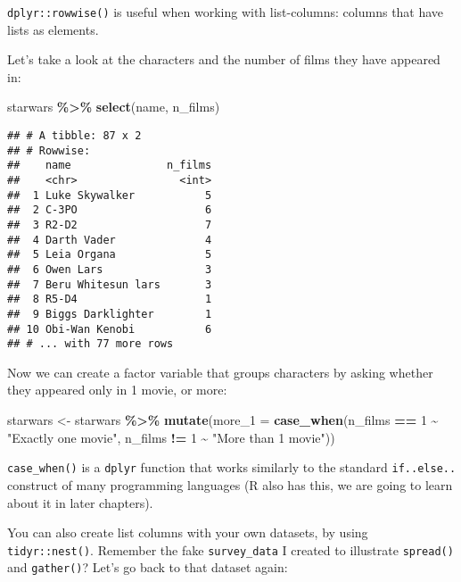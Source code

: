 \documentclass[
]{article}
\newenvironment{Shaded}{\begin{snugshade}}{\end{snugshade}}
\newcommand{\DataTypeTok}[1]{\textcolor[rgb]{0.13,0.29,0.53}{#1}}
\newcommand{\DecValTok}[1]{\textcolor[rgb]{0.00,0.00,0.81}{#1}}
\newcommand{\KeywordTok}[1]{\textcolor[rgb]{0.13,0.29,0.53}{\textbf{#1}}}
\newcommand{\NormalTok}[1]{#1}
\newcommand{\OperatorTok}[1]{\textcolor[rgb]{0.81,0.36,0.00}{\textbf{#1}}}
\newcommand{\StringTok}[1]{\textcolor[rgb]{0.31,0.60,0.02}{#1}}
\begin{document}
\texttt{dplyr::rowwise()} is useful when working with list-columns: columns that have lists as elements.

Let's take a look at the characters and the number of films they have appeared in:

\begin{Shaded}
\begin{Highlighting}[]
\NormalTok{starwars }\OperatorTok{\%\textgreater{}\%}
\StringTok{  }\KeywordTok{select}\NormalTok{(name, n\_films)}
\end{Highlighting}
\end{Shaded}

\begin{verbatim}
## # A tibble: 87 x 2
## # Rowwise: 
##    name               n_films
##    <chr>                <int>
##  1 Luke Skywalker           5
##  2 C-3PO                    6
##  3 R2-D2                    7
##  4 Darth Vader              4
##  5 Leia Organa              5
##  6 Owen Lars                3
##  7 Beru Whitesun lars       3
##  8 R5-D4                    1
##  9 Biggs Darklighter        1
## 10 Obi-Wan Kenobi           6
## # ... with 77 more rows
\end{verbatim}

Now we can create a factor variable that groups characters by asking whether they appeared only in
1 movie, or more:

\begin{Shaded}
\begin{Highlighting}[]
\NormalTok{starwars \textless{}{-}}\StringTok{ }\NormalTok{starwars }\OperatorTok{\%\textgreater{}\%}
\StringTok{  }\KeywordTok{mutate}\NormalTok{(}\DataTypeTok{more\_1 =} \KeywordTok{case\_when}\NormalTok{(n\_films }\OperatorTok{==}\StringTok{ }\DecValTok{1} \OperatorTok{\textasciitilde{}}\StringTok{ "Exactly one movie"}\NormalTok{,}
\NormalTok{                            n\_films }\OperatorTok{!=}\StringTok{ }\DecValTok{1} \OperatorTok{\textasciitilde{}}\StringTok{ "More than 1 movie"}\NormalTok{))}
\end{Highlighting}
\end{Shaded}

\texttt{case\_when()} is a \texttt{dplyr} function that works similarly to the standard \texttt{if..else..} construct of
many programming languages (R also has this, we are going to learn about it in later chapters).

You can also create list columns with your own datasets, by using \texttt{tidyr::nest()}. Remember the
fake \texttt{survey\_data} I created to illustrate \texttt{spread()} and \texttt{gather()}? Let's go back to that dataset
again:
\end{document}
